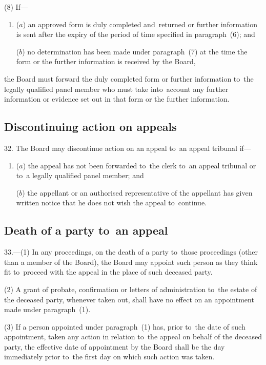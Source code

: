 \documentclass[12pt,a4paper]{article}
\begin{document}
(8) If—
\begin{enumerate}\item[]
($a$) an approved form is duly completed and~returned or further information is sent after the expiry of the period of time specified in paragraph~(6); and

($b$) no determination has been made under paragraph~(7) at the time the form or the further information is received by the Board,
\end{enumerate}
the Board must forward the duly completed form or further information to~the legally qualified panel member who must take into~account any further information or evidence set out in that form or the further information.

\subsection[32. Discontinuing action on appeals]{Discontinuing action on appeals}

32.  The Board may discontinue action on an appeal to~an appeal tribunal if—
\begin{enumerate}\item[]
($a$) the appeal has not been forwarded to~the clerk to~an appeal tribunal or to~a legally qualified panel member; and

($b$) the appellant or an authorised representative of the appellant has given written notice that he does not wish the appeal to~continue.
\end{enumerate}

\subsection[33. Death of a party to~an appeal]{Death of a party to~an appeal}

33.---(1)  In any proceedings, on the death of a party to~those proceedings (other than a member of the Board), the Board may appoint such person as they think fit to~proceed with the appeal in the place of such deceased party.

(2) A grant of probate, confirmation or letters of administration to~the estate of the deceased party, whenever taken out, shall have no effect on an appointment made under paragraph~(1).

(3) If a person appointed under paragraph~(1) has, prior to~the date of such appointment, taken any action in relation to~the appeal on behalf of the deceased party, the effective date of appointment by the Board shall be the day immediately prior to~the first day on which such action was taken.
\end{document}
